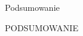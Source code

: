 \begin{frame}{Podsumowanie}
    \begin{center}
        {\huge PODSUMOWANIE}
    \end{center}
\end{frame}